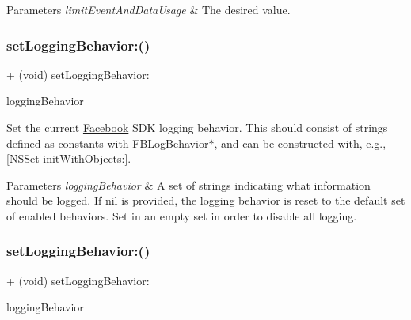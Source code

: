 \begin{DoxyParams}{Parameters}
{\em limit\+Event\+And\+Data\+Usage} & The desired value. \\
\hline
\end{DoxyParams}
\mbox{\label{interfaceFBSettings_aaaf513653d6a8e2d05e0ecea865155c0}} 
\subsubsection{\texorpdfstring{set\+Logging\+Behavior\+:()}{setLoggingBehavior:()}\hspace{0.1cm}{\footnotesize\ttfamily [1/5]}}
{\footnotesize\ttfamily + (void) set\+Logging\+Behavior\+: \begin{DoxyParamCaption}\item[{(N\+S\+Set $\ast$)}]{logging\+Behavior }\end{DoxyParamCaption}}

Set the current \hyperlink{interfaceFacebook}{Facebook} S\+DK logging behavior. This should consist of strings defined as constants with F\+B\+Log\+Behavior$\ast$, and can be constructed with, e.\+g., \mbox{[}N\+S\+Set init\+With\+Objects\+:\mbox{]}.


\begin{DoxyParams}{Parameters}
{\em logging\+Behavior} & A set of strings indicating what information should be logged. If nil is provided, the logging behavior is reset to the default set of enabled behaviors. Set in an empty set in order to disable all logging. \\
\hline
\end{DoxyParams}
\mbox{\label{interfaceFBSettings_aaaf513653d6a8e2d05e0ecea865155c0}} 
\subsubsection{\texorpdfstring{set\+Logging\+Behavior\+:()}{setLoggingBehavior:()}\hspace{0.1cm}{\footnotesize\ttfamily [2/5]}}
{\footnotesize\ttfamily + (void) set\+Logging\+Behavior\+: \begin{DoxyParamCaption}\item[{(N\+S\+Set $\ast$)}]{logging\+Behavior }\end{DoxyParamCaption}}

